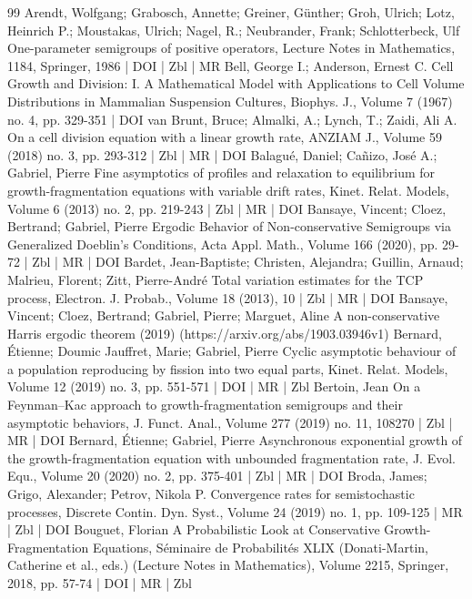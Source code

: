 \documentclass[10pt]{amsart}
\theoremstyle{definition}\newtheorem{defi}[theo]{Definition}\newtheorem{rema}[theo]{Remark}\newtheorem{exam}[theo]{Example}\newtheorem{exem}[theo]{Example}\newtheorem{nota}[theo]{Notation}
\newcommand{\1}{\mathds{1}}
\begin{document}
\begin{thebibliography}{99}
Arendt, Wolfgang; Grabosch, Annette; Greiner, Günther; Groh, Ulrich; Lotz, Heinrich P.; Moustakas, Ulrich; Nagel, R.; Neubrander, Frank; Schlotterbeck, Ulf One-parameter semigroups of positive operators, Lecture Notes in Mathematics, 1184, Springer, 1986 | DOI | Zbl | MR
Bell, George I.; Anderson, Ernest C. Cell Growth and Division: I. A Mathematical Model with Applications to Cell Volume Distributions in Mammalian Suspension Cultures, Biophys. J., Volume 7 (1967) no. 4, pp. 329-351 | DOI
van Brunt, Bruce; Almalki, A.; Lynch, T.; Zaidi, Ali A. On a cell division equation with a linear growth rate, ANZIAM J., Volume 59 (2018) no. 3, pp. 293-312 | Zbl | MR | DOI
Balagué, Daniel; Cañizo, José A.; Gabriel, Pierre Fine asymptotics of profiles and relaxation to equilibrium for growth-fragmentation equations with variable drift rates, Kinet. Relat. Models, Volume 6 (2013) no. 2, pp. 219-243 | Zbl | MR | DOI
Bansaye, Vincent; Cloez, Bertrand; Gabriel, Pierre Ergodic Behavior of Non-conservative Semigroups via Generalized Doeblin’s Conditions, Acta Appl. Math., Volume 166 (2020), pp. 29-72 | Zbl | MR | DOI
Bardet, Jean-Baptiste; Christen, Alejandra; Guillin, Arnaud; Malrieu, Florent; Zitt, Pierre-André Total variation estimates for the TCP process, Electron. J. Probab., Volume 18 (2013), 10 | Zbl | MR | DOI
Bansaye, Vincent; Cloez, Bertrand; Gabriel, Pierre; Marguet, Aline A non-conservative Harris ergodic theorem (2019) (https://arxiv.org/abs/1903.03946v1)
Bernard, Étienne; Doumic Jauffret, Marie; Gabriel, Pierre Cyclic asymptotic behaviour of a population reproducing by fission into two equal parts, Kinet. Relat. Models, Volume 12 (2019) no. 3, pp. 551-571 | DOI | MR | Zbl
Bertoin, Jean On a Feynman–Kac approach to growth-fragmentation semigroups and their asymptotic behaviors, J. Funct. Anal., Volume 277 (2019) no. 11, 108270 | Zbl | MR | DOI
Bernard, Étienne; Gabriel, Pierre Asynchronous exponential growth of the growth-fragmentation equation with unbounded fragmentation rate, J. Evol. Equ., Volume 20 (2020) no. 2, pp. 375-401 | Zbl | MR | DOI
Broda, James; Grigo, Alexander; Petrov, Nikola P. Convergence rates for semistochastic processes, Discrete Contin. Dyn. Syst., Volume 24 (2019) no. 1, pp. 109-125 | MR | Zbl | DOI
Bouguet, Florian A Probabilistic Look at Conservative Growth-Fragmentation Equations, Séminaire de Probabilités XLIX (Donati-Martin, Catherine et al., eds.) (Lecture Notes in Mathematics), Volume 2215, Springer, 2018, pp. 57-74 | DOI | MR | Zbl

\end{thebibliography}
\end{document}
